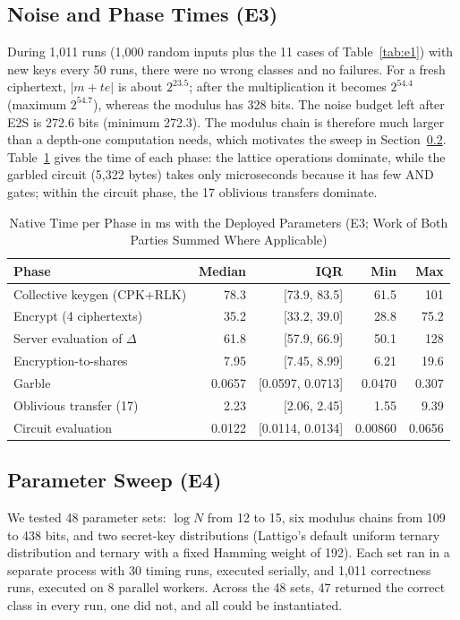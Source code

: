 \documentclass[conference,letterpaper]{IEEEtran}
\begin{document}
\subsection{Noise and Phase Times (E3)}\label{sec:e3}
During 1,011 runs (1,000 random inputs plus the 11 cases of Table~\ref{tab:e1}) with new keys every 50 runs, there were no wrong classes and no failures. For a fresh ciphertext, $|m+te|$ is about $2^{23.5}$; after the multiplication it becomes $2^{54.4}$ (maximum $2^{54.7}$), whereas the modulus has 328 bits. The noise budget left after E2S is 272.6 bits (minimum 272.3). The modulus chain is therefore much larger than a depth-one computation needs, which motivates the sweep in Section~\ref{sec:e4}. Table~\ref{tab:e3} gives the time of each phase: the lattice operations dominate, while the garbled circuit (5,322 bytes) takes only microseconds because it has few AND gates; within the circuit phase, the 17 oblivious transfers dominate.

\begin{table}[t]
\caption{Native Time per Phase in ms with the Deployed Parameters (E3; Work of Both Parties Summed Where Applicable)}
\label{tab:e3}
\centering
\scriptsize
\setlength{\tabcolsep}{3pt}
\begin{tabular}{lrrrr}
\hline
Phase & Median & IQR & Min & Max \\
\hline
Collective keygen (CPK+RLK) & 78.3 & [73.9, 83.5] & 61.5 & 101 \\
Encrypt (4 ciphertexts) & 35.2 & [33.2, 39.0] & 28.8 & 75.2 \\
Server evaluation of $\Delta$ & 61.8 & [57.9, 66.9] & 50.1 & 128 \\
Encryption-to-shares & 7.95 & [7.45, 8.99] & 6.21 & 19.6 \\
Garble & 0.0657 & [0.0597, 0.0713] & 0.0470 & 0.307 \\
Oblivious transfer (17) & 2.23 & [2.06, 2.45] & 1.55 & 9.39 \\
Circuit evaluation & 0.0122 & [0.0114, 0.0134] & 0.00860 & 0.0656 \\
\hline
\end{tabular}
\end{table}

\subsection{Parameter Sweep (E4)}\label{sec:e4}
We tested 48 parameter sets: $\log N$ from 12 to 15, six modulus chains from 109 to 438 bits, and two secret-key distributions (Lattigo's default uniform ternary distribution and ternary with a fixed Hamming weight of 192). Each set ran in a separate process with 30 timing runs, executed serially, and 1,011 correctness runs, executed on 8 parallel workers. Across the 48 sets, 47 returned the correct class in every run, one did not, and all could be instantiated.
\end{document}
